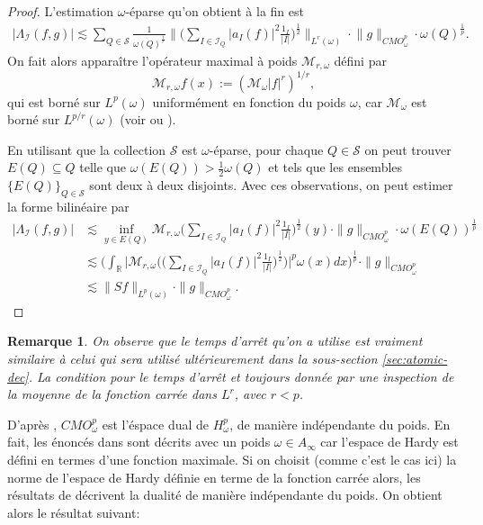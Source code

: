\documentclass[11pt]{amsart}
\newtheorem*{remark}{Remarque}
\newcommand{\rr}{\mathbb}
\newcommand{\ii}{\mathscr}
\newcommand{\ic}{\mathcal}
\begin{document}
\begin{proof}
L'estimation $\omega$-\'eparse qu'on obtient \`a la fin est 
\begin{align*}
\vert \Lambda_{\ii I}(f, g) \vert \lesssim \sum_{Q \in \ic S} \frac{1}{\omega\left( Q \right)^{\frac{1}{r}}} \big\|  \big( \sum_{I \in \ii I_Q} \vert a_I(f) \vert^2  \frac{1_I}{\vert I \vert}   \big)^{\frac{1}{2}} \big\|_{L^r\left(\omega \right)} \cdot \big\| g \big\|_{CMO_\omega^p} \cdot \omega(Q)^{\frac{1}{p}}.
\end{align*}
On fait alors appara\^itre l'op\'erateur maximal \`a poids $\ic M_{r, \omega}$ d\'efini par 
\[
\ic M_{r, \omega} f(x):= \left( \ic M_\omega \vert f \vert^r  \right)^{1/r},
\]
qui est born\'e sur $L^p(\omega)$ uniform\'ement en fonction du poids $\omega$, car $\ic M_\omega$ est born\'e sur $L^{p/r}(\omega)$ (voir \cite[Th\'eor\`eme 15.1]{LernerNazarov} ou \cite{BernicotFreyPetermichl}).

En utilisant que la collection $\ic S$ est $\omega$-\'eparse, pour chaque $Q \in \ic S$ on peut trouver $E(Q) \subseteq Q$ telle que $\omega(E(Q)) > \frac{1}{2} \omega(Q)$ et tels que les ensembles $\lbrace E(Q)  \rbrace_{Q \in \ic S}$ sont deux \`a deux disjoints. Avec ces observations, on peut estimer la forme bilin\'eaire par
\begin{align*}
\vert \Lambda_{\ii I}(f, g) \vert & \lesssim \inf_{y \in E(Q)} \ic M_{r, \omega} \big( \sum_{I \in \ii I_Q} \vert a_I(f) \vert^2  \frac{1_I}{\vert I \vert}   \big)^{\frac{1}{2}}(y) \cdot \| g \|_{CMO_\omega^p} \cdot \omega(E(Q))^{\frac{1}{p}} \\
& \lesssim  \big(\int_{\rr R} \vert \ic M_{r, \omega} \big( \big( \sum_{I \in \ii I_Q} \vert a_I(f) \vert^2  \frac{1_I}{\vert I \vert}   \big)^{\frac{1}{2}}  \big)  \vert^p \omega(x) dx\big)^{\frac{1}{p}} \cdot \| g \|_{CMO_\omega^p} \\
&\lesssim \| Sf \|_{L^p\left( \omega \right)} \cdot \| g \|_{CMO_\omega^p}.
\end{align*}
\end{proof}

\begin{remark}
On observe que le temps d'arr\^et qu'on a utilise est vraiment similaire \`a celui qui sera utilis\'e ult\'erieurement dans la sous-section \ref{sec:atomic-dec}. La condition pour le temps d'arr\^et et toujours donn\'ee par une inspection de la moyenne de la fonction carr\'ee dans $L^r$, avec $r<p$.   
\end{remark}

D'apr\`es \cite{Lee-Lin-Lin}, $CMO_\omega^p$ est l'\'espace dual de $H^p_\omega$, de mani\`ere ind\'ependante du poids. En fait, les \'enonc\'es dans \cite{Lee-Lin-Lin} sont d\'ecrits avec un poids $\omega\in A_\infty$ car l'espace de Hardy est d\'efini en termes d'une fonction maximale. Si on choisit (comme c'est le cas ici) la norme de l'espace de Hardy d\'efinie en terme de la fonction carr\'ee alors, les r\'esultats de \cite{Lee-Lin-Lin} d\'ecrivent la dualit\'e de mani\`ere ind\'ependante du poids.
On obtient alors le r\'esultat suivant:
\end{document}
